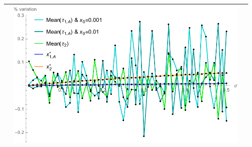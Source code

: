 \begin{table}[!htb]
\begin{tabular}{c|c|c}
\begin{minipage}{.45\textwidth}
		\end{minipage}
		& \begin{minipage}{.45\textwidth}
			\includegraphics[width=\linewidth]{StopTime/3_var1.pdf}
		\end{minipage} \\ \hline
	\end{tabular}
\label{res2}
\end{table}


